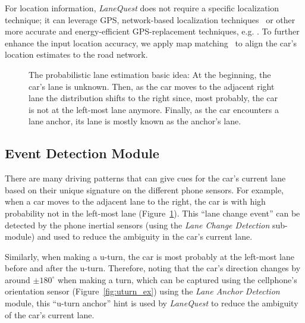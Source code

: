 \documentclass[10pt, conference, compsocconf]{IEEEtran}
\def \sys {\textit{LaneQuest}}
\begin{document}
For location information, \sys{} does not require a specific localization technique; it can leverage GPS, network-based localization techniques~\cite{cellsense,ibrahim2011hidden,ibrahim2010cellsense,ibrahim2013enabling,placelab} or other more accurate and energy-efficient GPS-replacement techniques, e.g. \cite{aly2013dejavu}. To further enhance the input location accuracy, we apply map matching~\cite{snapnet} to align the car's location estimates to the road network.
\begin{figure}[!t]
\centering
\caption{The probabilistic lane estimation basic idea: At the beginning, the car's lane is unknown. Then, as the car moves to the adjacent right lane the distribution shifts to the right since, most probably, the car is not at the left-most lane anymore. Finally, as the car encounters a lane anchor, its lane is mostly known as the anchor's lane.}
\label{fig:markov_ex}
\end{figure}
\subsection{Event Detection Module}
There are many driving patterns that can give cues for the car's current lane based on their unique signature on the different phone sensors. For example, when a car moves to the adjacent lane to the right, the car is with high probability not in the left-most lane (Figure~\ref{fig:markov_ex}). This ``lane change event'' can be detected by the phone inertial sensors (using the \emph{Lane Change Detection} sub-module) and used to reduce the ambiguity in the car's current lane.

Similarly, when making a u-turn, the car is most probably at the left-most lane before and after the u-turn. Therefore, noting that the car's direction changes by around $\pm 180^\circ$ when making a turn, which can be captured using the cellphone's orientation sensor (Figure~\ref{fig:uturn_ex}) using the \emph{Lane Anchor Detection} module, this ``u-turn anchor'' hint is used by \sys{} to reduce the ambiguity of the car's current lane.
\end{document}
